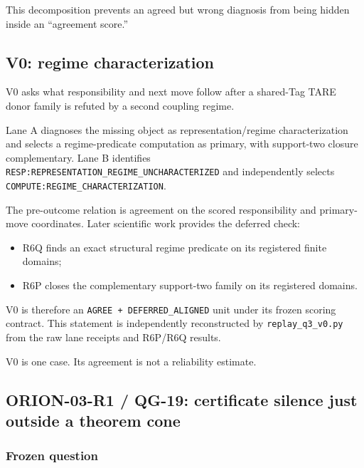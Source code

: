 \documentclass[10pt]{article}
\providecommand{\tightlist}{%
  \setlength{\itemsep}{0pt}\setlength{\parskip}{0pt}}
\begin{document}
This decomposition prevents an agreed but wrong diagnosis from being
hidden inside an ``agreement score.''

\hypertarget{v0-regime-characterization}{%
\subsection{V0: regime
characterization}\label{v0-regime-characterization}}

V0 asks what responsibility and next move follow after a shared-Tag TARE
donor family is refuted by a second coupling regime.

Lane A diagnoses the missing object as representation/regime
characterization and selects a regime-predicate computation as primary,
with support-two closure complementary. Lane B identifies
\texttt{RESP:REPRESENTATION\_REGIME\_UNCHARACTERIZED} and independently
selects \texttt{COMPUTE:REGIME\_CHARACTERIZATION}.

The pre-outcome relation is agreement on the scored responsibility and
primary-move coordinates. Later scientific work provides the deferred
check:

\begin{itemize}
\tightlist
\item
  R6Q finds an exact structural regime predicate on its registered
  finite domains;
\item
  R6P closes the complementary support-two family on its registered
  domains.
\end{itemize}

V0 is therefore an \texttt{AGREE\ +\ DEFERRED\_ALIGNED} unit under its
frozen scoring contract. This statement is independently reconstructed
by \texttt{replay\_q3\_v0.py} from the raw lane receipts and R6P/R6Q
results.

V0 is one case. Its agreement is not a reliability estimate.

\hypertarget{orion-03-r1-qg-19-certificate-silence-just-outside-a-theorem-cone}{%
\subsection{ORION-03-R1 / QG-19: certificate silence just outside a
theorem
cone}\label{orion-03-r1-qg-19-certificate-silence-just-outside-a-theorem-cone}}

\hypertarget{frozen-question}{%
\subsubsection{Frozen question}\label{frozen-question}}
\end{document}
